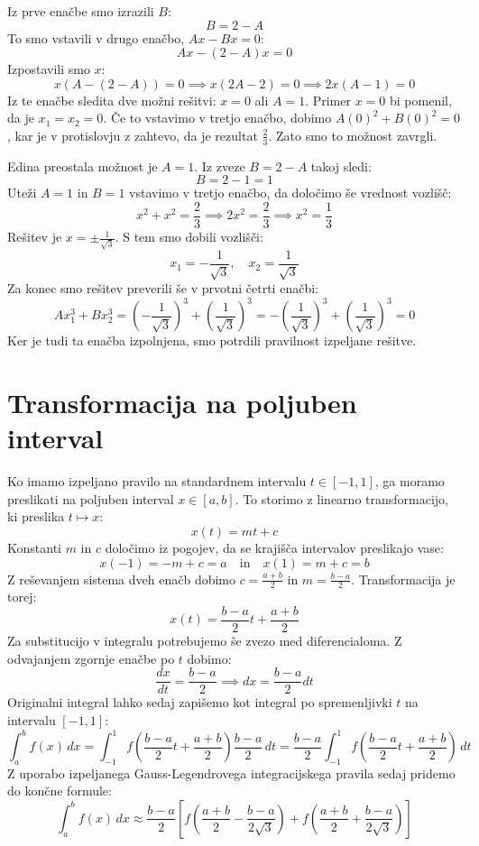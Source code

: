 \documentclass{article}
\begin{document}
Iz prve enačbe smo izrazili $B$:
\[
B = 2 - A
\]
To smo vstavili v drugo enačbo, $Ax - Bx = 0$:
\[
Ax - (2-A)x = 0
\]
Izpostavili smo $x$:
\[
x(A - (2-A)) = 0 \implies x(2A - 2) = 0 \implies 2x(A-1) = 0
\]
Iz te enačbe sledita dve možni rešitvi: $x=0$ ali $A=1$.
Primer $x=0$ bi pomenil, da je $x_1=x_2=0$. Če to vstavimo v tretjo enačbo, 
dobimo $A(0)^2 + B(0)^2 = 0$, kar je v protislovju z zahtevo, da je rezultat 
$\frac{2}{3}$. Zato smo to možnost zavrgli.

Edina preostala možnost je $A=1$. Iz zveze $B = 2 - A$ takoj sledi:
\[
B = 2 - 1 = 1
\]
Uteži $A=1$ in $B=1$ vstavimo v tretjo enačbo, da določimo še vrednost vozlišč:
\[
x^2 + x^2 = \frac{2}{3} \implies 2x^2 = \frac{2}{3} \implies x^2 = \frac{1}{3}
\]
Rešitev je $x = \pm\frac{1}{\sqrt{3}}$. S tem smo dobili vozlišči:
\[
x_1 = -\frac{1}{\sqrt{3}}, \quad x_2 = \frac{1}{\sqrt{3}}
\]
Za konec smo rešitev preverili še v prvotni četrti enačbi:
\[ Ax_1^3 + Bx_2^3 = \left(-\frac{1}{\sqrt{3}}\right)^3 + \left(\frac{1}{\sqrt{3}}\right)^3 = 
-\left(\frac{1}{\sqrt{3}}\right)^3 + \left(\frac{1}{\sqrt{3}}\right)^3 = 0 \]
Ker je tudi ta enačba izpolnjena, smo potrdili pravilnost izpeljane rešitve.

\section{Transformacija na poljuben interval}

Ko imamo izpeljano pravilo na standardnem intervalu $t \in [-1, 1]$, ga moramo preslikati 
na poljuben interval $x \in [a, b]$. To storimo z linearno transformacijo, ki 
preslika $t \mapsto x$:
\[
x(t) = m t + c
\]
Konstanti $m$ in $c$ določimo iz pogojev, da se krajišča intervalov preslikajo vase:
\[
x(-1) = -m + c = a \quad \text{in} \quad x(1) = m + c = b
\]
Z reševanjem sistema dveh enačb dobimo $c = \frac{a+b}{2}$ in $m = \frac{b-a}{2}$. 
Transformacija je torej:
\[
x(t) = \frac{b-a}{2}t + \frac{a+b}{2}
\]
Za substitucijo v integralu potrebujemo še zvezo med diferencialoma. Z odvajanjem zgornje 
enačbe po $t$ dobimo:
\[
\frac{dx}{dt} = \frac{b-a}{2} \implies dx = \frac{b-a}{2} dt
\]
Originalni integral lahko sedaj zapišemo kot integral po spremenljivki $t$ na intervalu $[-1, 1]$:
\[
\int_{a}^{b} f(x) \,dx = \int_{-1}^{1} f\left(\frac{b-a}{2}t + \frac{a+b}{2}\right) \frac{b-a}{2} \,dt
=  \frac{b-a}{2} \int_{-1}^{1} f\left(\frac{b-a}{2}t + \frac{a+b}{2}\right) \,dt
\]
Z uporabo izpeljanega Gauss-Legendrovega integracijskega pravila sedaj pridemo do končne formule:
\[
\int_{a}^{b} f(x) \,dx \approx \frac{b-a}{2} \left[ f\left( \frac{a+b}{2} - \frac{b-a}{2\sqrt{3}} \right) 
+ f\left( \frac{a+b}{2} + \frac{b-a}{2\sqrt{3}} \right) \right]
\]
\end{document}
